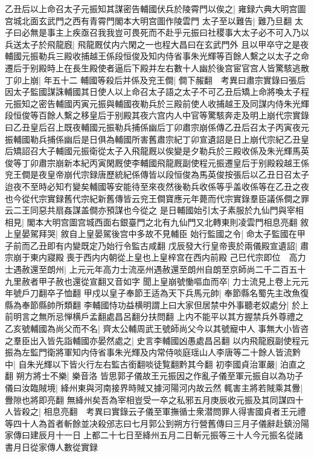 乙丑后以上命召太子元振知其謀密告輔國伏兵於陵霄門以俟之|{
	雍録六典大明宫圖宫城北面玄武門之西有青霄門閣本大明宫圖作陵雲門}
太子至以難告|{
	難乃旦翻}
太子曰必無是事主上疾亟召我我豈可畏死而不赴乎元振曰社稷事大太子必不可入乃以兵送太子於飛龍廐|{
	飛龍厩仗内六閑之一也程大昌曰在玄武門外}
且以甲卒守之是夜輔國元振勒兵三殿收捕越王係段恒俊及知内侍省事朱光輝等百餘人繫之以太子之命遷后于别殿時上在長生殿使者逼后下殿并左右數十人幽於後宫宦官宫人皆驚駭逃散丁卯上崩|{
	年五十二}
輔國等殺后并係及兖王僴|{
	僴下赧翻　考異曰肅宗實錄曰張后因太子監國謀誅輔國其日使人以上命召太子語之太子不可乙丑后矯上命將喚太子程元振知之密告輔國丙寅元振與輔國夜勒兵於三殿前使人收捕越王及同謀内侍朱光輝段恒俊等百餘人繫之移皇后于别殿其夜六宫内人中官等驚駭奔走及明上崩代宗實錄曰乙丑皇后召上既夜輔國元振勒兵捕係幽后丁卯肅宗崩係傳乙丑后召太子丙寅夜元振輔國勒兵捕係幽后是日俱為輔國所害舊肅宗紀丁卯宣遺詔是日上崩代宗紀乙丑皇后矯詔召大子輔國元振衛從太子入飛龍厩以俟變是夕勒兵於三殿收係及朱光輝馬英俊等丁卯肅宗崩新本紀丙寅閑厩使李輔國飛龍厩副使程元振遷皇后于别殿殺越王係兖王僴是夜皇帝崩代宗録唐歷統紀係傳皆以段恒俊為馬英俊按張后以乙丑日召太子迨夜不至時必知冇變矣輔國等安能待至來夜然後勒兵收係等乎盖收係等在乙丑之夜也今從代宗實録舊代宗紀新舊傳皆云兖王僴寶應元年薨而代宗實錄羣臣議係僴之罪云二王同惡共扇姦謀盖僴亦預謀也今從之}
是日輔國始引太子素服於九仙門與宰相相見|{
	閣本大明宫圖宫城西面右銀臺門之北有九仙門又北轉東則凌雲門相息亮翻}
敘上皇晏駕拜哭|{
	敘自上皇晏駕後宫中多故不見輔臣}
始行監國之令|{
	命太子監國在甲子前而乙丑即有内變既定乃始行令監古咸翻}
戊辰發大行皇帝喪於兩儀殿宣遺詔|{
	肅宗崩于東内寢殿喪于西内内朝從上皇也上皇梓宫在西内前殿}
己巳代宗即位　高力士遇赦還至朗州|{
	上元元年高力士流巫州遇赦還至朗州自朗至京師尚二千二百五十九里赦者甲子赦也還從宣翻又音如字}
聞上皇崩號慟嘔血而卒|{
	力士流見上卷上元元年號戶刀翻卒子恤翻}
甲戍以皇子奉節王适為天下兵馬元帥|{
	奉節縣名蜀先主改魚復縣為奉節縣帥所類翻}
李輔國恃功益横明謂上曰大家但居禁中外事聽老奴處分|{
	於上前明言之無所忌惮横戶孟翻處昌呂翻分扶問翻}
上内不能平以其方握禁兵外尊禮之乙亥號輔國為尚父而不名|{
	齊太公輔周武王號師尚父今以其號寵中人}
事無大小皆咨之羣臣出入皆先詣輔國亦晏然處之|{
	史言李輔國凶愚處昌呂翻}
以内飛龍廐副使程元振為左監門衛將軍知内侍省事朱光輝及内常侍啖庭瑶山人李唐等二十餘人皆流黔中|{
	自朱光輝以下皆火行左右監古銜翻啖徒覧翻黔其今翻}
初李國貞治軍嚴|{
	泊直之翻}
朔方將士不樂|{
	樂音洛}
皆思郭子儀故王元振因之作亂子儀至軍元振自以為功子儀曰汝臨賊境|{
	絳州東與河南接界時賊又據河陽河内故云然}
輒害主將若賊乘其釁|{
	釁隙也將即亮翻}
無絳州矣吾為宰相豈受一卒之私邪五月庚辰收元振及其同謀四十人皆殺之|{
	相息亮翻　考異曰實錄云子儀至軍撫循士衆潜問罪人得害國貞者王元禮等四十人為首者斬餘並决殺邠志曰七月郭公到朔方行營舊傳曰三月子儀辭赴鎮汾陽家傳曰建辰月十一日上都二十七日至絳州五月二日斬元振等三十人今元振名從諸書月日從家傳人數從實録}
